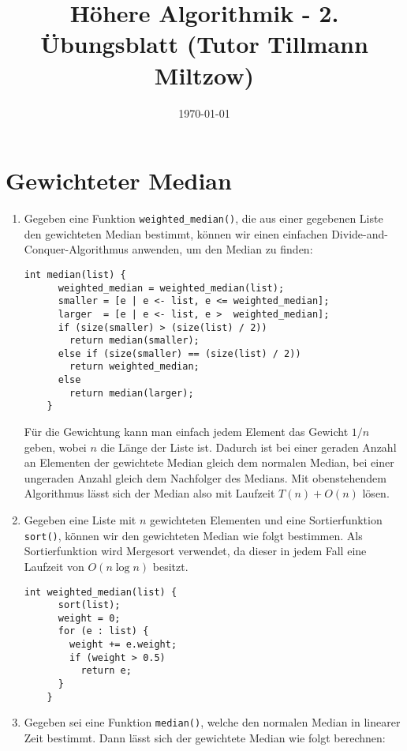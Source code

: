 \documentclass[a4paper,10pt]{scrartcl}
\title{H\"ohere Algorithmik - 2. \"Ubungsblatt (Tutor Tillmann Miltzow)}
\author{\Authors}
\date{\today}
\begin{document}
\maketitle

\section{Gewichteter Median}
\begin{enumerate}
\item	Gegeben eine Funktion \texttt{weighted\_median()}, die
	aus einer gegebenen Liste den gewichteten Median bestimmt,
	können wir einen einfachen Divide-and-Conquer-Algorithmus
	anwenden, um den Median zu finden:

	\begin{lstlisting}[numbers=none]
	int median(list) {
	  weighted_median = weighted_median(list);
	  smaller = [e | e <- list, e <= weighted_median];
	  larger  = [e | e <- list, e >  weighted_median];
	  if (size(smaller) > (size(list) / 2))
	    return median(smaller);
	  else if (size(smaller) == (size(list) / 2))
	    return weighted_median;
	  else
	    return median(larger);
	}
	\end{lstlisting}

	Für die Gewichtung kann man einfach jedem Element das Gewicht
	$1/n$ geben, wobei $n$ die Länge der Liste ist. Dadurch ist bei
	einer geraden Anzahl an Elementen der gewichtete Median gleich
	dem normalen Median, bei einer ungeraden Anzahl gleich dem
	Nachfolger des Medians. Mit obenstehendem Algorithmus lässt sich
	der Median also mit Laufzeit $T(n) + O(n)$ lösen.

\item	Gegeben eine Liste mit $n$ gewichteten Elementen und eine
	Sortierfunktion \texttt{sort()}, können wir den gewichteten
	Median wie folgt bestimmen. Als Sortierfunktion wird Mergesort
	verwendet, da dieser in jedem Fall eine Laufzeit von $O(n \log n)$ besitzt.

	\begin{lstlisting}[numbers=none]
	int weighted_median(list) {
	  sort(list);
	  weight = 0;
	  for (e : list) {
	    weight += e.weight;
	    if (weight > 0.5)
	      return e;
	  }
	}
	\end{lstlisting}

\item	Gegeben sei eine Funktion \texttt{median()}, welche den normalen
	Median in linearer Zeit bestimmt. Dann lässt sich der gewichtete
	Median wie folgt berechnen:


\end{enumerate}
\end{document}
